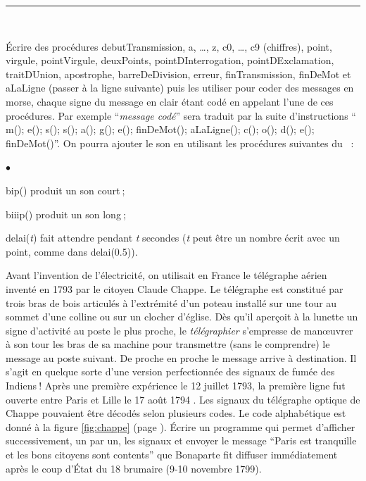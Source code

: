 \noindent \rule{137mm}{0.1mm} %
\begin{exercices}{\ \\
\vspace{-\baselineskip}

\sloppy
\tiret  Écrire des procédures {\idt debutTransmission}, {\idt a}, \ldots, {\idt z}, {\idt c0},
\ldots, {\idt c9} (chiffres), {\idt point}, {\idt virgule},
 {\idt pointVirgule}, {\idt deuxPoints}, {\idt pointDInterrogation},
 {\idt pointDExclamation}, {\idt traitDUnion}, {\idt apostrophe},
  {\idt barreDeDivision},
 {\idt erreur}, {\idt finTransmission}, {\idt finDeMot} et
 {\idt aLaLigne} (passer à la ligne suivante) puis les utiliser pour coder
 des messages en morse, chaque signe du message en clair étant codé en appelant l'une
 de ces procédures. Par exemple ``{\em message codé}'' sera traduit par la suite d'instructions
`` {\ttfamily\idt m(); e(); s(); s(); a(); g(); e(); finDeMot(); aLaLigne();
 c(); o(); d(); e(); finDeMot()}''. On pourra ajouter le son en utilisant les procédures suivantes
 du \robot~:
 \begin{list}{$\scriptscriptstyle\bullet$}{
}
   \item {\idt bip()} produit un son court$\:$;
   \item {\idt biiip()} produit un son long$\:$;
   \item {\idt delai({\rm\em t})} fait attendre pendant {\em t} secondes ({\em t} peut être un nombre écrit avec un point, comme dans {\idt delai(0.5)}).
 \end{list}
 
 \tiret Avant l'invention de l'électricité, on utilisait en France le télégraphe  aérien inventé en
 1793 par le citoyen Claude Chappe. Le télégraphe est constitué par trois bras de bois articulés
 à l'extrémité d'un poteau ins\-tal\-lé sur une tour au sommet d'une colline ou sur un clocher d'église.
 Dès qu'il aperçoit à la lunette un signe d'activité au poste le plus proche, le {\em télégraphier}
 s'empresse de manœuvrer à son tour les bras de sa machine pour transmettre (sans le comprendre)
  le message au poste suivant. De proche en proche le message arrive à destination. Il s'agit en
  quelque sorte d'une version perfectionnée des signaux de fumée des Indiens$\:$! Après une première
  expérience le 12 juillet 1793, la première ligne fut ouverte entre Paris et Lille le 17 août 1794
  \cite{bertho}. Les signaux du télégraphe optique de Chappe pouvaient être décodés
  selon plusieurs codes. Le code alphabétique est donné à la figure \ref{fig:chappe} (page
  \pageref{fig:chappe}). Écrire un programme qui permet d'afficher successivement, un par un, les
  signaux et envoyer le message ``Paris est tranquille et les bons citoyens sont contents''
  que Bonaparte fit diffuser immédiatement après le coup d'État du 18 brumaire (9-10 novembre 
  1799).
  
}
\end{exercices}
